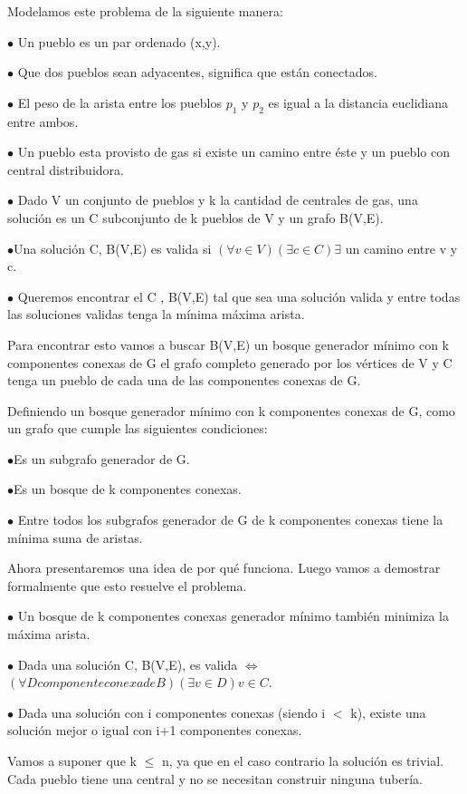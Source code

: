 Modelamos este problema de la siguiente manera:

$\bullet$ Un pueblo es un par ordenado (x,y).

$\bullet$ Que dos pueblos sean adyacentes, significa que están conectados.

$\bullet$ El peso de la arista entre los pueblos $p_1$ y $p_2$ es igual a la distancia euclidiana entre ambos.

$\bullet$ Un pueblo esta provisto de gas si existe un camino entre éste y un pueblo con central distribuidora.

$\bullet$ Dado V un conjunto de pueblos y k la cantidad de centrales de gas, una solución es un C subconjunto de k pueblos de V y un grafo B(V,E).

$\bullet$Una solución C, B(V,E) es valida si $(\forall v \in V)(\exists c \in C) \exists$ un camino entre v y c. 

$\bullet$ Queremos encontrar el C , B(V,E) tal que sea una solución valida y entre todas las soluciones validas tenga la mínima máxima arista.

Para encontrar esto vamos a buscar B(V,E) un bosque generador mínimo con k componentes conexas de G el grafo completo generado por los vértices de V y C tenga un pueblo de cada una de las componentes conexas de G.

Definiendo un bosque generador mínimo con k componentes conexas de G, como un grafo que cumple las siguientes condiciones:

$\bullet$Es un subgrafo generador de G. 

$\bullet$Es un bosque de k componentes conexas.

$\bullet$ Entre todos los subgrafos generador de G de k componentes conexas tiene la mínima suma de aristas.

Ahora presentaremos una idea de por qué funciona. Luego vamos a demostrar formalmente que esto resuelve el problema. 

$\bullet$ Un bosque de k componentes conexas generador mínimo también minimiza la máxima arista.

$\bullet$ Dada una solución C, B(V,E), es valida $\Longleftrightarrow$ $(\forall D componente conexa de B)(\exists v \in D) v \in C$.  

$\bullet$ Dada una solución con i componentes conexas (siendo i $<$ k), existe una solución mejor o igual con i+1 componentes conexas.

Vamos a suponer que k $\leq$ n, ya que en el caso contrario la solución es trivial. Cada pueblo tiene una central y no se necesitan construir ninguna tubería.